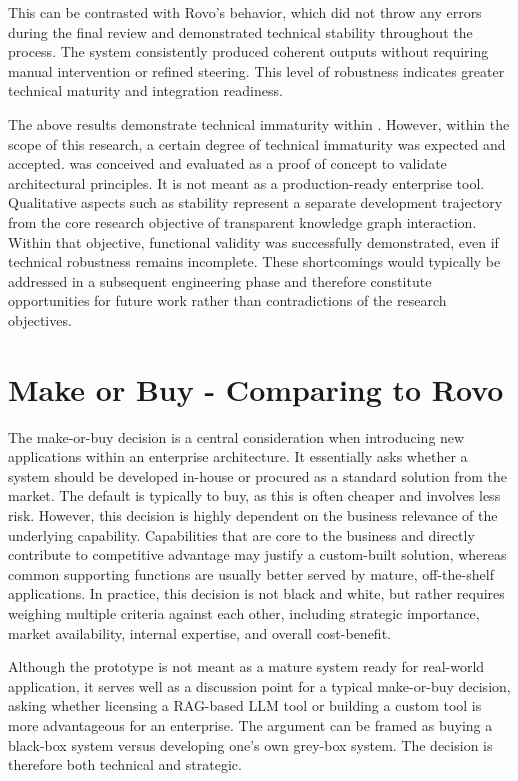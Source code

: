 This can be contrasted with Rovo's behavior, which did not throw any errors during the final review and demonstrated technical stability throughout the process. The system consistently produced coherent outputs without requiring manual intervention or refined steering. This level of robustness indicates greater technical maturity and integration readiness.

The above results demonstrate technical immaturity within \prototype{}. However, within the scope of this research, a certain degree of technical immaturity was expected and accepted. \prototype{} was conceived and evaluated as a proof of concept to validate architectural principles. It is not meant as a production-ready enterprise tool. Qualitative aspects such as stability represent a separate development trajectory from the core research objective of transparent knowledge graph interaction. Within that objective, functional validity was successfully demonstrated, even if technical robustness remains incomplete. These shortcomings would typically be addressed in a subsequent engineering phase and therefore constitute opportunities for future work rather than contradictions of the research objectives.

\section{Make or Buy - Comparing \prototype{} to Rovo}
\label{sub:makeOrBuy}
The make-or-buy decision is a central consideration when introducing new applications within an enterprise architecture. It essentially asks whether a system should be developed in-house or procured as a standard solution from the market. The default is typically to buy, as this is often cheaper and involves less risk. However, this decision is highly dependent on the business relevance of the underlying capability. Capabilities that are core to the business and directly contribute to competitive advantage may justify a custom-built solution, whereas common supporting functions are usually better served by mature, off-the-shelf applications. In practice, this decision is not black and white, but rather requires weighing multiple criteria against each other, including strategic importance, market availability, internal expertise, and overall cost-benefit. \cite[pgs. 84-87]{jung2021masterclass}

Although the prototype is not meant as a mature system ready for real-world application, it serves well as a discussion point for a typical make-or-buy decision, asking whether licensing a RAG-based LLM tool or building a custom tool is more advantageous for an enterprise. The argument can be framed as buying a black-box system versus developing one's own grey-box system. The decision is therefore both technical and strategic.

